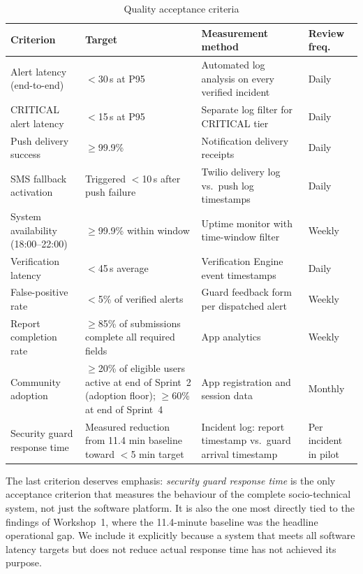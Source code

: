 \documentclass[12pt,a4paper]{article}
\begin{document}
\begin{table}[h]
\caption{Quality acceptance criteria}
\label{tab:accept}
\centering
\begin{tabularx}{\textwidth}{p{3.5cm}p{3.0cm}Xp{2.0cm}}
\toprule
\textbf{Criterion} & \textbf{Target} & \textbf{Measurement method} & \textbf{Review freq.} \\
\midrule
Alert latency (end-to-end) & $<$30\,s at P95 & Automated log analysis on every verified incident & Daily \\
CRITICAL alert latency & $<$15\,s at P95 & Separate log filter for CRITICAL tier & Daily \\
Push delivery success & $\geq$99.9\% & Notification delivery receipts & Daily \\
SMS fallback activation & Triggered $<$10\,s after push failure & Twilio delivery log vs.\ push log timestamps & Daily \\
System availability (18:00--22:00) & $\geq$99.9\% within window & Uptime monitor with time-window filter & Weekly \\
Verification latency & $<$45\,s average & Verification Engine event timestamps & Daily \\
False-positive rate & $<$5\% of verified alerts & Guard feedback form per dispatched alert & Weekly \\
Report completion rate & $\geq$85\% of submissions complete all required fields & App analytics & Weekly \\
Community adoption & $\geq$20\% of eligible users active at end of Sprint~2 (adoption floor); $\geq$60\% at end of Sprint~4 & App registration and session data & Monthly \\
Security guard response time & Measured reduction from 11.4 min baseline toward $<$5 min target & Incident log: report timestamp vs.\ guard arrival timestamp & Per incident in pilot \\
\bottomrule
\end{tabularx}
\end{table}

The last criterion deserves emphasis: \emph{security guard response
time} is the only acceptance criterion that measures
the behaviour of the complete socio-technical system,
not just the software platform. It is also the one most directly
tied to the findings of Workshop~1, where the 11.4-minute baseline
was the headline operational gap. We include it explicitly because
a system that meets all software latency targets but does not reduce
actual response time has not achieved its purpose.
\end{document}
